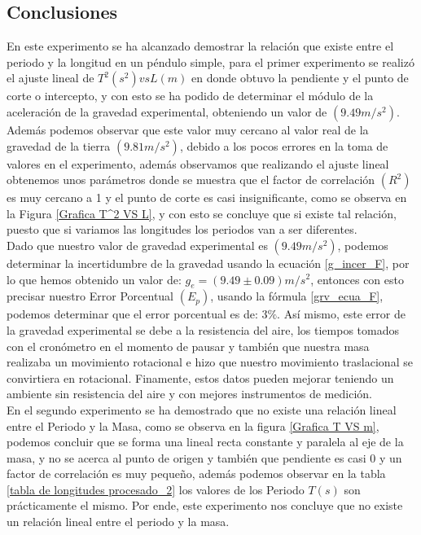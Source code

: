 \documentclass[10pt,a4paper]{article}
\begin{document}
\begin{multicols}{2}
	\section{Conclusiones}
	
En este experimento se ha alcanzado demostrar la relación que existe entre el periodo y la longitud en un péndulo simple, para el primer experimento se realizó el ajuste lineal de $T^2(s^2)vsL(m)$ en donde obtuvo la pendiente y el punto de corte o intercepto, y con esto se ha podido de determinar el módulo de la aceleración de la gravedad experimental, obteniendo un valor de $(9.49 m/s^2)$. \\
Además podemos observar que este valor muy cercano al valor real de la gravedad de la tierra $(9.81 m/s^2)$, debido a los pocos errores en la toma de valores en el experimento, además observamos que realizando el ajuste lineal obtenemos unos parámetros donde se muestra que el factor de correlación $(R^2)$ es muy cercano a 1 y el punto de corte es casi insignificante, como se observa en la Figura \ref{Grafica T^2 VS L}, y con esto se concluye que si existe tal relación, puesto que si variamos las longitudes los periodos van a ser diferentes.\\
Dado que nuestro valor de gravedad experimental es  $(9.49 m/s^2)$, podemos determinar la incertidumbre de la gravedad usando la ecuación \ref{g_incer_F}, por lo que hemos obtenido un valor de: $g_{e} = (9.49 \pm 0.09)  m/s^2$, entonces con esto precisar nuestro Error Porcentual $(E_{p})$, usando la fórmula \ref{grv_ecua_F}, podemos determinar que el error porcentual es de: $3\%$. Así mismo, este error de la gravedad experimental se debe a la resistencia del aire, los tiempos tomados con el cronómetro en el momento de pausar y también que nuestra masa realizaba un movimiento rotacional e hizo que nuestro movimiento traslacional se convirtiera en rotacional. Finamente, estos datos pueden mejorar teniendo un ambiente sin resistencia del aire y con mejores instrumentos de medición.\\
En el segundo experimento se ha demostrado que no existe una relación lineal entre el Periodo y la Masa, como se observa en la figura \ref{Grafica T VS m}, podemos concluir que se forma una lineal recta constante y paralela al eje de la masa, y no se acerca al punto de origen y también que pendiente es casi 0 y un factor de correlación es muy pequeño, además podemos observar en la tabla \ref{tabla de longitudes procesado_2} los valores de los Periodo $T(s)$ son prácticamente el mismo. Por ende, este experimento nos concluye que no existe un relación lineal entre el periodo y la masa.\\

\end{multicols}
	
	
\end{document}
